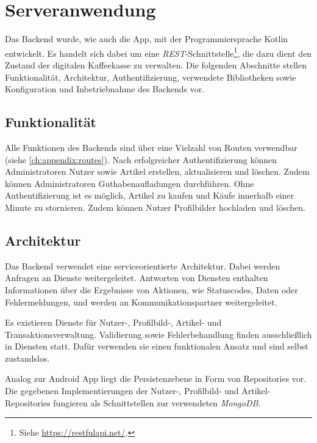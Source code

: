 \chapter{Serveranwendung}
\label{ch:backend}
Das Backend wurde, wie auch die App, mit der Programmiersprache Kotlin entwickelt.
Es handelt sich dabei um eine \textit{REST}-Schnittstelle\footnote{Siehe \url{https://restfulapi.net/}.}, die dazu dient den Zustand der digitalen Kaffeekasse zu verwalten.
Die folgenden Abschnitte stellen Funktionalität, Architektur, Authentifizierung, verwendete Bibliotheken sowie Konfiguration und Inbetriebnahme des Backends vor.

\section{Funktionalität}
\label{sec:backend:functionality}
Alle Funktionen des Backends sind über eine Vielzahl von Routen verwendbar (siehe \autoref{ch:appendix:routes}).
Nach erfolgreicher Authentifizierung können Administratoren Nutzer sowie Artikel erstellen, aktualisieren und löschen.
Zudem können Administratoren Guthabenaufladungen durchführen.
Ohne Authentifizierung ist es möglich, Artikel zu kaufen und Käufe innerhalb einer Minute zu stornieren.
Zudem können Nutzer Profilbilder hochladen und löschen.

\section{Architektur}
\label{sec:backend:architecture}
Das Backend verwendet eine serviceorientierte Architektur.
Dabei werden Anfragen an Dienste weitergeleitet.
Antworten von Diensten enthalten Informationen über die Ergebnisse von Aktionen, wie Statuscodes, Daten oder Fehlermeldungen, und werden an Kommunikationspartner weitergeleitet.

Es existieren Dienste für Nutzer-, Profilbild-, Artikel- und Transaktionsverwaltung.
Validierung sowie Fehlerbehandlung finden ausschließlich in Diensten statt.
Dafür verwenden sie einen funktionalen Ansatz und sind selbst zustandslos.

Analog zur Android App liegt die Persistenzebene in Form von Repositories vor.
Die gegebenen Implementierungen der Nutzer-, Profilbild- und Artikel-Repositories fungieren als Schnittstellen zur verwendeten \textit{MongoDB}.

